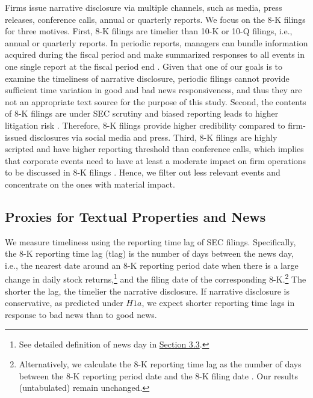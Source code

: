 \documentclass[letterpaper,12pt]{article}
\begin{document}
\begin{spacing}{1.5}
Firms issue narrative disclosure via multiple channels, such as media, press releases, conference calls, annual or quarterly reports. We focus on the 8-K filings for three motives. First, 8-K filings are timelier than 10-K or 10-Q filings, i.e., annual or quarterly reports. In periodic reports, managers can bundle information acquired during the fiscal period and make summarized responses to all events in one single report at the fiscal period end \cite{segalAreManagersStrategic2016}. Given that one of our goals is to examine the timeliness of narrative disclosure, periodic filings cannot provide sufficient time variation in good and bad news responsiveness, and thus they are not an appropriate text source for the purpose of this study. Second, the contents of 8-K filings are under SEC scrutiny and biased reporting leads to higher litigation risk \cite{rogersDisclosureToneShareholder2011}. Therefore, 8-K filings provide higher credibility compared to firm-issued disclosures via social media and press. Third, 8-K filings are highly scripted and have higher reporting threshold than conference calls, which implies that corporate events need to have at least a moderate impact on firm operations to be discussed in 8-K filings \cite{hassanFirmLevelPoliticalRisk2019}. Hence, we filter out less relevant events and concentrate on the ones with material impact. 

\subsection{Proxies for Textual Properties and News} \label{sec3.2}
\noindent We measure timeliness using the reporting time lag of SEC filings. Specifically, the 8-K reporting time lag (tlag) is the number of days between the news day, i.e., the nearest date around an 8-K reporting period date when there is a large change in daily stock returns,\footnote{See detailed definition of news day in \hyperref[sec3.3]{Section 3.3}.} and the filing date of the corresponding 8-K.\footnote{Alternatively, we calculate the 8-K reporting time lag as the number of days between the 8-K reporting period date and the 8-K filing date \cite{carterRelevanceForm8K1999, niessnerStrategicDisclosureTiming2015, chapmanInformationOverloadDisclosure2019}. Our results (untabulated) remain unchanged.} The shorter the lag, the timelier the narrative disclosure. If narrative disclosure is conservative, as predicted under $H1a$, we expect shorter reporting time lags in response to bad news than to good news.


\end{spacing}
\end{document}
